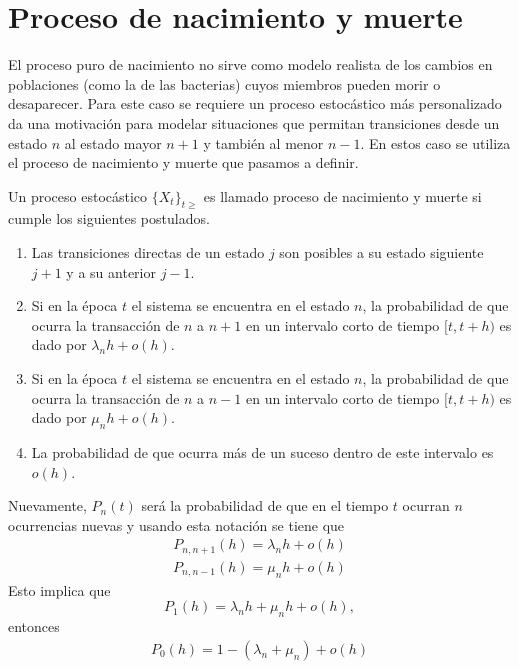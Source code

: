 \section{Proceso de nacimiento y muerte}
\label{proc_nac_mu}
El proceso puro de nacimiento no sirve como modelo realista de los cambios en poblaciones (como la de las bacterias) cuyos miembros pueden morir o desaparecer. Para este caso se requiere un proceso estocástico más personalizado da una motivación para modelar situaciones que permitan transiciones desde un estado $n$ al estado mayor $n+1$ y también al menor $n-1$. En estos caso se utiliza el proceso de nacimiento y muerte que pasamos a definir.\\
\begin{Def}
Un proceso estocástico $\{X_t\}_{t\geq}$ es  llamado proceso de nacimiento y muerte si cumple los siguientes postulados. 
    \begin{enumerate}
        \item Las transiciones directas de un estado $j$ son posibles a su estado siguiente $j+1$ y a su anterior $j-1$.
        \item Si en la época $t$ el sistema se encuentra en el estado $n$, la probabilidad de que ocurra la transacción de $n$ a $n+1$ en un intervalo corto de tiempo $[t,t+h)$ es dado por $\lambda_n h+o(h)$.
        \item Si en la época $t$ el sistema se encuentra en el estado $n$, la probabilidad de que ocurra la transacción de $n$ a $n-1$ en un intervalo corto de tiempo $[t,t+h)$ es dado por $\mu_n h+o(h)$.
        \item La probabilidad de que ocurra más de un suceso dentro de este intervalo es $o(h)$.
    \end{enumerate}
\end{Def}
Nuevamente, $P_n(t)$ será la probabilidad de que en el tiempo $t$ ocurran $n$ ocurrencias nuevas y usando esta notación se tiene que
\begin{eqnarray}
     P_{n,n+1}(h)=\lambda_n h + o(h)
    \label{procNacimientoMuerte-condicion-1}
\end{eqnarray}
\begin{eqnarray}
    P_{n,n-1}(h)=\mu_n h + o(h)
    \label{procNacimientoMuerte-condicion-2}
\end{eqnarray}
Esto implica que
$$P_1(h)=\lambda_n h +\mu_n h+ o(h),$$
entonces
\begin{eqnarray}
    P_0(h)=1-(\lambda_n+\mu_n)+o(h)
    \label{procNacimientoMuerte-condicion-3}
\end{eqnarray}
